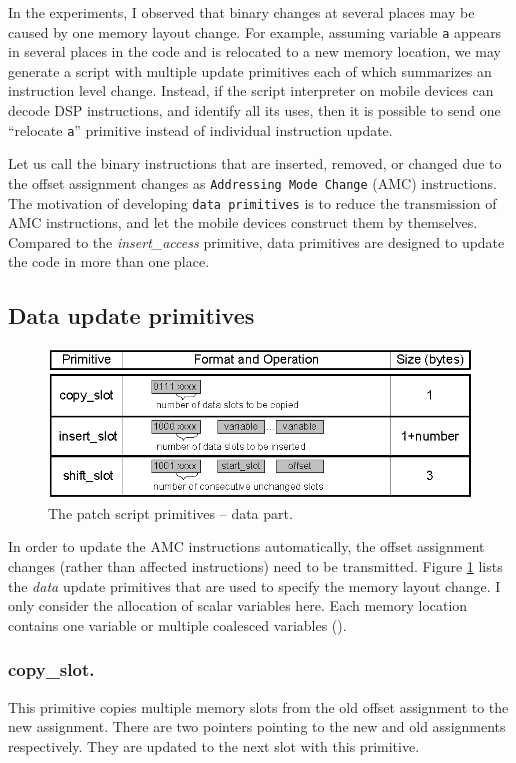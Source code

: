 In the experiments, I observed that binary changes at several places may be caused by one memory layout change. For example, assuming variable {\tt a} appears in several places in the code and is relocated to a new memory location, we may generate a script with multiple update primitives each of which summarizes an instruction level change. Instead, if the script interpreter on mobile devices can decode DSP instructions, and identify all its uses, then it is possible to send one ``relocate {\tt a}'' primitive instead of individual instruction update. 

Let us call the binary instructions that are inserted, removed, or changed due to the offset assignment changes as {\tt Addressing Mode Change} (AMC) instructions. The motivation of developing {\tt data primitives} is to reduce the transmission of AMC instructions, and let the mobile devices construct them by themselves. Compared to the 
{\em insert\_access} primitive, data primitives are designed to update the code in more than one place.

\subsection{Data update primitives}
\begin{figure}[htbp]
\centering
\includegraphics[scale=1.2]{./figures/fopcodedata.eps}
\caption{The patch script primitives -- data part.}
\label{fdatascript}
\end{figure}
In order to update the AMC instructions automatically, the offset assignment changes (rather than affected instructions) need to be transmitted. 
Figure \ref{fdatascript} lists the {\em data} update primitives that are used to specify the memory layout change. I only consider the allocation of scalar variables here. Each memory location contains one variable or multiple coalesced variables (\cite{related:ottoni,related:zhuang}). 

\subsubsection{copy\_slot.}  This primitive copies multiple memory slots from the old offset assignment to the new assignment. There are two pointers pointing to the new and old assignments respectively. They are updated to the next slot with this primitive.


